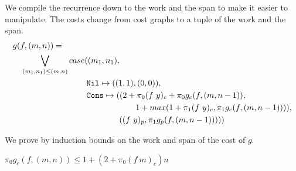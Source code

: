 We compile the recurrence down to the work and the span to make it easier to manipulate.
The costs change from cost graphs to a tuple of the work and the span.
\begin{equation*}
  \begin{split}
  &g(f, (m, n)) = \\
  &\quad \bigvee\limits_{(m_1, n_1) \leq (m, n)} case((m_1, n_1), \\
  &\qquad\quad\quad\quad\qquad\quad\quad \texttt{Nil} \mapsto ((1, 1), (0, 0)), \\
  &\qquad\quad\quad\quad\qquad\quad\quad \texttt{Cons} \mapsto ((2 + \pi_0(f\ y)_c + \pi_0 g_c(f, (m, n-1)), \\
  &\qquad\quad\quad\quad\qquad\quad\quad\quad\qquad\quad\quad\quad                     1 + max(1 + \pi_1(f\ y)_c, \pi_1 g_c(f, (m, n-1)))), \\
  &\qquad\quad\quad\quad\qquad\quad\quad\quad\quad\quad\quad                  ((f\ y)_p, \pi_1 g_p(f, (m, n-1))))) 
  \end{split}
\end{equation*}

We prove by induction bounds on the work and span of the cost of $g$.

\begin{theorem}
$\pi_0 g_c(f, (m, n)) \leq 1 + (2 + \pi_0(f\ m)_c)n$
\end{theorem}

